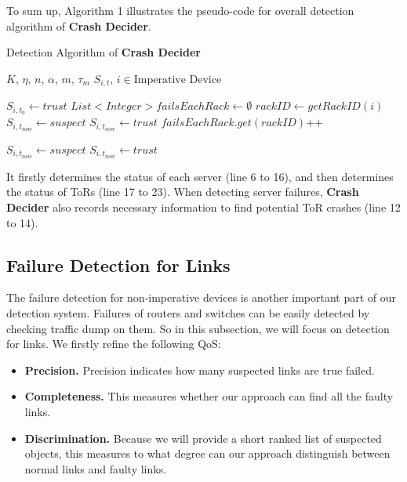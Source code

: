 \documentclass{sig-alternate-05-2015}
\begin{document}
To sum up, Algorithm 1 illustrates the pseudo-code for overall detection algorithm of \textbf{Crash Decider}.
\renewcommand{\algorithmicrequire}{\textbf{Input:}}
\renewcommand{\algorithmicensure}{\textbf{Output:}}
\begin{algorithm}
	\caption{Detection Algorithm of \textbf{Crash Decider}}
	\begin{algorithmic}[1]
		\REQUIRE $K$, $\eta$, $n$, $\alpha$, $m$, $\tau_m$
		\ENSURE $S_{i,t}$, $i \in \text{Imperative Device}$
	
            \STATE $S_{i,t_0} \leftarrow trust$
        \ENDFOR
            \STATE $List<Integer> failsEachRack \leftarrow \emptyset$
                \STATE $rackID \leftarrow getRackID(i)$
                    \STATE $S_{i,t_{now}} \leftarrow suspect$
                \ELSE
                    \STATE $S_{i,t_{now}} \leftarrow trust$
                    \STATE $failsEachRack.get(rackID)\text{++}$
                    \ENDIF
                \ENDIF
            \ENDFOR

                    \STATE $S_{i,t_{now}} \leftarrow suspect$
                \ELSE
                    \STATE $S_{i,t_{now}} \leftarrow trust$
                \ENDIF
            \ENDFOR
		\ENDWHILE
	\end{algorithmic}
\end{algorithm}
It firstly determines the status of each server (line 6 to 16), and then determines the status of ToRs (line 17 to 23). When detecting server failures, \textbf{Crash Decider} also records necessary information to find potential ToR crashes (line 12 to 14).

\subsection{Failure Detection for Links}
The failure detection for non-imperative devices is another important part of our detection system. Failures of routers and switches can be easily detected by checking traffic dump on them. So in this subsection, we will focus on detection for links. We firstly refine the following QoS:
\begin{itemize}
  \item \textbf{Precision.} Precision indicates how many suspected links are true failed.
  \item \textbf{Completeness.} This measures whether our approach can find all the faulty links.
  \item \textbf{Discrimination.} Because we will provide a short ranked list of suspected objects, this measures to what degree can our approach distinguish between normal links and faulty links.
\end{itemize}
\end{document}
